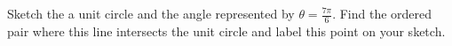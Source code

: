 {Sketch the a unit circle and the angle represented by $\theta = \frac{7\pi}{6}$. Find the ordered pair where this line intersects the unit circle and label this point on your sketch.}
{\text{}\\ \label{fig:03_04_ex_16}\\
}
